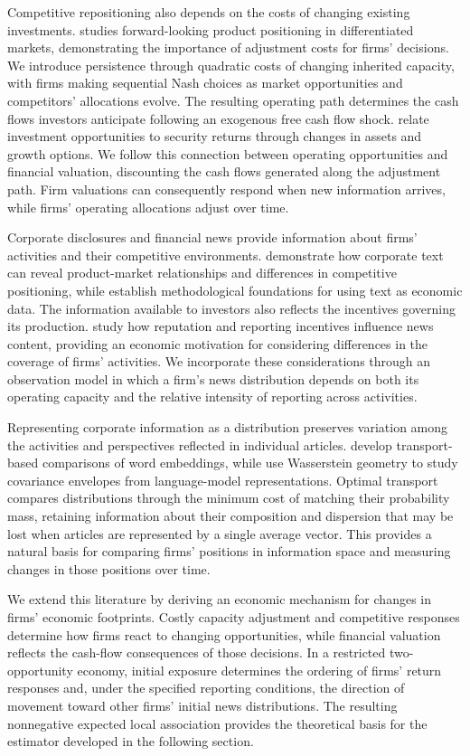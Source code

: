 Competitive repositioning also depends on the costs of changing existing
investments. \citet{sweeting_positioning_2013} studies forward-looking
product positioning in differentiated markets, demonstrating the importance
of adjustment costs for firms' decisions.
We introduce persistence through quadratic costs of changing inherited
capacity, with firms making sequential Nash choices as market opportunities
and competitors' allocations evolve.
The resulting operating path determines the cash flows investors anticipate
following an exogenous free cash flow shock. \citet{berk_green_naik_growth_options_1999}
relate investment opportunities to security returns through changes in assets
and growth options.
We follow this connection between operating opportunities and financial
valuation, discounting the cash flows generated along the adjustment path.
Firm valuations can consequently respond when new information arrives, while
firms' operating allocations adjust over time.

Corporate disclosures and financial news provide information about firms'
activities and their competitive environments. \citet{hoberg_phillips_2016}
demonstrate how corporate text can reveal product-market relationships and
differences in competitive positioning, while
\citet{gentzkow_text_as_data_2019} establish methodological foundations for
using text as economic data.
The information available to investors also reflects the incentives governing
its production. \citet{gentzkow_media_bias_2006} study how reputation and
reporting incentives influence news content, providing an economic motivation
for considering differences in the coverage of firms' activities.
We incorporate these considerations through an observation model in which a
firm's news distribution depends on both its operating capacity and the
relative intensity of reporting across activities.

Representing corporate information as a distribution preserves variation
among the activities and perspectives reflected in individual articles.
\citet{kusner_word_embeddings_2015} develop transport-based comparisons of
word embeddings, while \citet{gawronsky_continuous_2026} use Wasserstein
geometry to study covariance envelopes from language-model representations.
Optimal transport compares distributions through the minimum cost of matching
their probability mass, retaining information about their composition and
dispersion that may be lost when articles are represented by a single average vector.
This provides a natural basis for comparing firms' positions in information
space and measuring changes in those positions over time.

We extend this literature by deriving an economic mechanism for changes in
firms' economic footprints.
Costly capacity adjustment and competitive responses determine how firms
react to changing opportunities, while financial valuation reflects the
cash-flow consequences of those decisions.
In a restricted two-opportunity economy, initial exposure determines the
ordering of firms' return responses and, under the specified reporting
conditions, the direction of movement toward other firms' initial news distributions.
The resulting nonnegative expected local association provides the theoretical
basis for the estimator developed in the following section.
